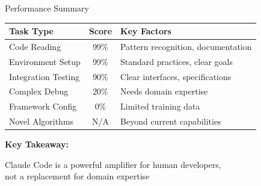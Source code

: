\documentclass[aspectratio=169]{beamer}
\begin{document}
\begin{frame}{Performance Summary}
	\begin{center}
		\begin{tabular}{|l|c|p{5cm}|}
			\hline
			\textbf{Task Type} & \textbf{Score} & \textbf{Key Factors} \\
			\hline
			Code Reading & {\color{green}99\%} & Pattern recognition, documentation \\
			Environment Setup & {\color{green}99\%} & Standard practices, clear goals \\
			Integration Testing & {\color{green}90\%} & Clear interfaces, specifications \\
			Complex Debug & {\color{orange}20\%} & Needs domain expertise \\
			Framework Config & {\color{red}0\%} & Limited training data \\
			Novel Algorithms & {\color{red}N/A} & Beyond current capabilities \\
			\hline
		\end{tabular}
	\end{center}
	
	\vspace{0.5cm}
	
	\textbf{Key Takeaway:}
	\begin{center}
		\large
		{\color{highlight}Claude Code is a powerful amplifier for human developers,}\\
		{\color{highlight}not a replacement for domain expertise}
	\end{center}
\end{frame}
\end{document}
